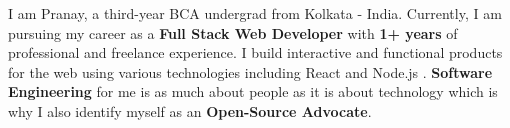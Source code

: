 
I am Pranay, a third-year BCA undergrad from Kolkata - India. Currently, I am pursuing my career as a \textbf{Full Stack Web Developer} with \textbf{1+ years} of professional and freelance experience. I build interactive and functional products for the web using various technologies including React and Node.js . \textbf{Software Engineering} for me is as much about people as it is about technology which is why I also identify myself as an \textbf{Open-Source Advocate}.